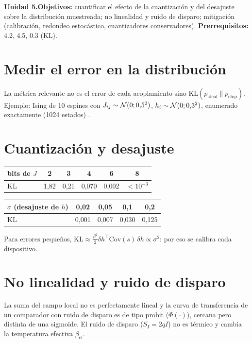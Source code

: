 \documentclass[11pt,a4paper]{article}
\begin{document}

\noindent\textbf{Unidad 5.}\quad\textbf{Objetivos:} cuantificar el efecto de la cuantización y del desajuste sobre la distribución muestreada; no
linealidad y ruido de disparo; mitigación (calibración, redondeo estocástico, cuantizadores conservadores).
\textbf{Prerrequisitos:} 4.2, 4.5, 0.3 (KL).

\section{Medir el error en la distribución}
La métrica relevante no es el error de cada acoplamiento sino $\mathrm{KL}(p_{\text{ideal}}\|p_{\text{chip}})$. Ejemplo: Ising de 10 espines con
$J_{ij}\sim\mathcal{N}(0;0{,}5^2)$, $h_i\sim\mathcal{N}(0;0{,}3^2)$, enumerado exactamente (1024 estados) \evS.

\section{Cuantización y desajuste}
\begin{center}\begin{tabular}{lccccc}\toprule
bits de $J$ & 2 & 3 & 4 & 6 & 8\\\midrule
KL & 1,82 & 0,21 & 0,070 & 0,002 & $<10^{-3}$\\\bottomrule\end{tabular}\qquad
\begin{tabular}{lcccc}\toprule
$\sigma$ (desajuste de $h$) & 0,02 & 0,05 & 0,1 & 0,2\\\midrule
KL & 0,001 & 0,007 & 0,030 & 0,125\\\bottomrule\end{tabular}\end{center}
Para errores pequeños, $\mathrm{KL}\approx\tfrac{\beta^2}2\delta h^\top\mathrm{Cov}(s)\,\delta h\propto\sigma^2$: por eso se calibra cada dispositivo.

\section{No linealidad y ruido de disparo}
La suma del campo local no es perfectamente lineal y la curva de transferencia de un comparador con ruido de disparo es de tipo probit
($\Phi(\cdot)$), cercana pero distinta de una sigmoide. El ruido de disparo ($S_I=2qI$) no es térmico y cambia la temperatura efectiva $\beta_{\text{ef}}$.
\end{document}
